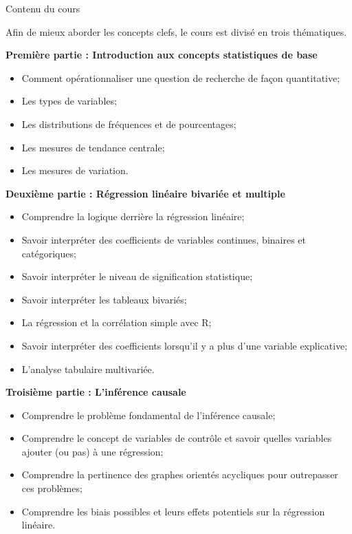 \documentclass[10pt]{article}
\newcommand{\ulsub}[1]{%
  \needspace{3\baselineskip}%
  \vspace{10pt}%
  {\headfont\fontsize{12.5}{15}\selectfont #1}\par
  \vspace{2pt}%
}
\begin{document}
\ulsub{Contenu du cours}
{\fontsize{9.5}{12.5}\selectfont
Afin de mieux aborder les concepts clefs, le cours est divisé en trois thématiques.\par
\vspace{6pt}
\textbf{Première partie : Introduction aux concepts statistiques de base}
\begin{itemize}
  \item Comment opérationnaliser une question de recherche de façon quantitative;
  \item Les types de variables;
  \item Les distributions de fréquences et de pourcentages;
  \item Les mesures de tendance centrale;
  \item Les mesures de variation.
\end{itemize}
\vspace{6pt}
\textbf{Deuxième partie : Régression linéaire bivariée et multiple}
\begin{itemize}
  \item Comprendre la logique derrière la régression linéaire;
  \item Savoir interpréter des coefficients de variables continues, binaires et catégoriques;
  \item Savoir interpréter le niveau de signification statistique;
  \item Savoir interpréter les tableaux bivariés;
  \item La régression et la corrélation simple avec R;
  \item Savoir interpréter des coefficients lorsqu'il y a plus d'une variable explicative;
  \item L'analyse tabulaire multivariée.
\end{itemize}
\vspace{6pt}
\textbf{Troisième partie : L'inférence causale}
\begin{itemize}
  \item Comprendre le problème fondamental de l'inférence causale;
  \item Comprendre le concept de variables de contrôle et savoir quelles variables ajouter (ou pas) à une régression;
  \item Comprendre la pertinence des graphes orientés acycliques pour outrepasser ces problèmes;
  \item Comprendre les biais possibles et leurs effets potentiels sur la régression linéaire.
\end{itemize}\par}
\end{document}
